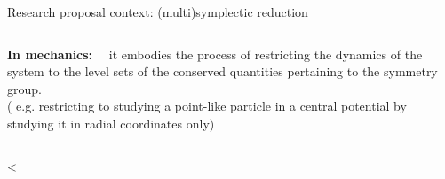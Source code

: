 \documentclass[handout,10pt]{beamer}
\begin{document}
\begin{frame}{Research proposal context: (multi)symplectic reduction}
\begin{columns}
		\begin{column}{0.6\textwidth}
				\textbf{\color{UniGreen}In mechanics:}~~
			it embodies the process of restricting the dynamics of the system to the level sets of the conserved quantities pertaining to the symmetry group.		
			\\
			\color{gray}\small( e.g. restricting to studying a point-like particle in a central potential by studying it in radial coordinates only)
		\end{column}	
	\end{columns}	


<\end{frame}


\end{document}
